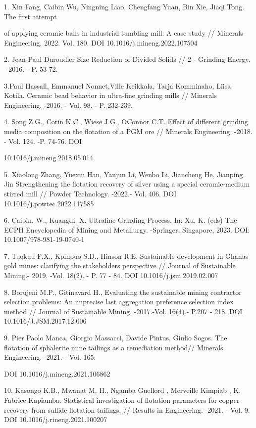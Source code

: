 \begin{noparindent}
1. Xin Fang, Caibin Wu, Ningning Liao, Chengfang Yuan, Bin Xie, Jiaqi
Tong. The first attempt

of applying ceramic balls in industrial tumbling mill: A case study //
Minerals Engineering. 2022. Vol. 180. DOI 10.1016/j.mineng.2022.107504

2. Jean-Paul Duroudier Size Reduction of Divided Solids // 2 - Grinding
Energy. - 2016. - P. 53-72.

3.Paul Hassall, Emmanuel Nonnet,Ville Keikkala, Tarja Komminaho, Liisa
Kotila. Ceramic bead behavior in ultra-fine grinding mills // Minerals
Engineering. -2016. - Vol. 98. - P. 232-239.

4. Song Z.G., Corin K.C., Wiese J.G., O\textquotesingle Connor C.T.
Effect of different grinding media composition on the flotation of a PGM
ore // Minerals Engineering. -2018. - Vol. 124. -P. 74-76. DOI

10.1016/j.mineng.2018.05.014

5. Xiaolong Zhang, Yuexin Han, Yanjun Li, Wenbo Li, Jiancheng He,
Jianping Jin Strengthening the flotation recovery of silver using a
special ceramic-medium stirred mill // Powder Technology. -2022.- Vol.
406. DOI 10.1016/j.powtec.2022.117585

6. Caibin, W., Kuangdi, X. Ultrafine Grinding Process. In: Xu, K. (eds)
The ECPH Encyclopedia of Mining and Metallurgy. -Springer, Singapore,
2023. DOI: 10.1007/978-981-19-0740-1

7. Tuokuu F.X., Kpinpuo S.D., Hinson R.E. Sustainable development in
Ghana\textquotesingle s gold mines: clarifying the
stakeholder\textquotesingle s perspective // Journal of Sustainable
Mining.- 2019. -Vol. 18(2). - P. 77 - 84. DOI 10.1016/j.jsm.2019.02.007

8. Borujeni M.P., Gitinavard H., Evaluating the sustainable mining
contractor selection problems: An imprecise last aggregation preference
selection index method // Journal of Sustainable Mining. -2017.-Vol.
16(4).- P.207 - 218. DOI 10.1016/J.JSM.2017.12.006

9. Pier Paolo Manca, Giorgio Massacci, Davide Pintus, Giulio Sogos. The
flotation of sphalerite mine tailings as a remediation method// Minerals
Engineering. -2021. - Vol. 165.

DOI 10.1016/j.mineng.2021.106862

10. Kasongo K.B., Mwanat M. H., Ngamba Guellord , Merveille Kimpiab , K.
Fabrice Kapiamba. Statistical investigation of flotation parameters for
copper recovery from sulfide flotation tailings. // Results in
Engineering. -2021. - Vol. 9. DOI 10.1016/j.rineng.2021.100207


\end{noparindent}
